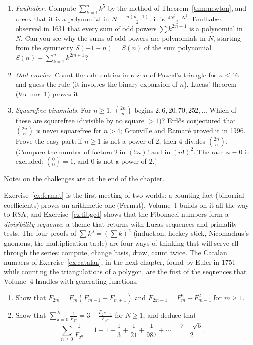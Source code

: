 \begin{challenge}
\begin{enumerate}[label=(\arabic*)]
\item \emph{Faulhaber.} Compute $\sum_{k=1}^nk^5$ by the method of Theorem~\ref{thm:newton}, and check that it is a polynomial in $N=\frac{n(n+1)}2$: it is $\frac{4N^3-N^2}3$.
Faulhaber observed in 1631 that every sum of odd powers $\sum k^{2m+1}$ is a polynomial in $N$. Can you see why the sums of odd powers are polynomials in $N$, starting from the symmetry $S(-1-n)=S(n)$ of the sum polynomial $S(n)=\sum_{k=1}^n k^{2m+1}$?
\item \emph{Odd entries.} Count the odd entries in row $n$ of Pascal's triangle for $n\le16$ and guess the rule (it involves the binary expansion of $n$). Lucas' theorem (Volume~1) proves it.
\item \emph{Squarefree binomials.} For $n\ge1$, $\binom{2n}n$ begins $2,6,20,70,252,\dots$ Which of these are squarefree (divisible by no square $>1$)? Erd\H{o}s conjectured that $\binom{2n}n$ is never squarefree for $n>4$; Granville and Ramar\'e proved it in 1996. Prove the easy part: if $n\ge1$ is not a power of $2$, then $4$ divides $\binom{2n}n$. (Compare the number of factors $2$ in $(2n)!$ and in $(n!)^2$. The case $n=0$ is excluded: $\binom00=1$, and $0$ is not a power of $2$.)
\end{enumerate}
Notes on the challenges are at the end of the chapter.
\end{challenge}

\begin{beauty}
Exercise~\ref{ex:fermat} is the first meeting of two worlds: a counting fact (binomial coefficients)
proves an arithmetic one (Fermat). Volume~1 builds on it all the way to RSA, and Exercise~\ref{ex:fibgcd}
shows that the Fibonacci numbers form a \emph{divisibility sequence}, a theme that returns with
Lucas sequences and primality tests. The four proofs of $\sum k^3=(\sum k)^2$ (induction, hockey stick, Nicomachus's gnomons, the multiplication table) are
four ways of thinking that will serve all through the series: compute, change basis, draw, count twice. The Catalan numbers of Exercise~\ref{ex:catalan}, in the next chapter,
found by Euler in 1751 while counting the triangulations of a polygon, are the first of the sequences that Volume~4 handles with generating functions.
\end{beauty}

\begin{exercise}[$\star\star$]\label{pb:millin}
\begin{enumerate}[label=(\alph*)]
\item Show that $F_{2m}=F_m(F_{m-1}+F_{m+1})$ and $F_{2m-1}=F_m^2+F_{m-1}^2$ for $m\ge1$.
\item Show that $\sum_{n=0}^N\frac1{F_{2^n}}=3-\frac{F_{2^N-1}}{F_{2^N}}$ for $N\ge1$, and deduce that
\[
\sum_{n\ge0}\frac1{F_{2^n}}=1+1+\frac13+\frac1{21}+\frac1{987}+\cdots=\frac{7-\sqrt5}2.
\]
\end{enumerate}
\end{exercise}

